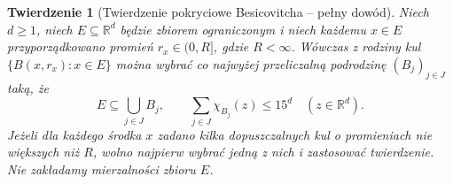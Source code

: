 \documentclass[11pt,a4paper,oneside]{book}
\numberwithin{equation}{chapter}
\theoremstyle{plain}
\newtheorem{twierdzenie}{Twierdzenie}[chapter]
\theoremstyle{definition}
\theoremstyle{remark}
\begin{document}
\begin{twierdzenie}[Twierdzenie pokryciowe Besicovitcha -- pełny dowód]
\label{thm:besicovitch-24}
Niech $d\ge1$, niech $E\subseteq\mathbb R^d$ będzie
zbiorem ograniczonym i niech każdemu $x\in E$
przyporządkowano promień $r_x\in(0,R]$, gdzie
$R<\infty$. Wówczas z rodziny kul $\{B(x,r_x):x\in E\}$
można wybrać co najwyżej przeliczalną podrodzinę
$(B_j)_{j\in J}$ taką, że
\begin{equation}\label{eq:besicovitch-infinite-24}
 E\subseteq\bigcup_{j\in J}B_j,\qquad
 \sum_{j\in J}\chi_{B_j}(z)\le15^d
 \quad(z\in\mathbb R^d).
\end{equation}
Jeżeli dla każdego środka $x$ zadano kilka dopuszczalnych
kul o promieniach nie większych niż $R$, wolno najpierw
wybrać jedną z nich i zastosować twierdzenie.
Nie zakładamy mierzalności zbioru $E$.
\end{twierdzenie}
\end{document}

